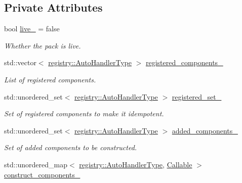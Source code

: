 \subsection*{Private Attributes}
\begin{DoxyCompactItemize}
\item 
bool \hyperlink{structvt_1_1runtime_1_1component_1_1_component_pack_a77177fd8678d5bf04bada652ffee1e2f}{live\+\_\+} = false
\begin{DoxyCompactList}\small\item\em Whether the pack is live. \end{DoxyCompactList}\item 
std\+::vector$<$ \hyperlink{namespacevt_1_1runtime_1_1component_1_1registry_a9b86518797c7bb91babf0ca8ee7d06e6}{registry\+::\+Auto\+Handler\+Type} $>$ \hyperlink{structvt_1_1runtime_1_1component_1_1_component_pack_a615b981d265458c952406691c89ce0f6}{registered\+\_\+components\+\_\+}
\begin{DoxyCompactList}\small\item\em List of registered components. \end{DoxyCompactList}\item 
std\+::unordered\+\_\+set$<$ \hyperlink{namespacevt_1_1runtime_1_1component_1_1registry_a9b86518797c7bb91babf0ca8ee7d06e6}{registry\+::\+Auto\+Handler\+Type} $>$ \hyperlink{structvt_1_1runtime_1_1component_1_1_component_pack_a7dd24ee6d0e1a8e66dd35257ba3e6d75}{registered\+\_\+set\+\_\+}
\begin{DoxyCompactList}\small\item\em Set of registered components to make it idempotent. \end{DoxyCompactList}\item 
std\+::unordered\+\_\+set$<$ \hyperlink{namespacevt_1_1runtime_1_1component_1_1registry_a9b86518797c7bb91babf0ca8ee7d06e6}{registry\+::\+Auto\+Handler\+Type} $>$ \hyperlink{structvt_1_1runtime_1_1component_1_1_component_pack_aebf0761f1902a5336a247190ad8ba47d}{added\+\_\+components\+\_\+}
\begin{DoxyCompactList}\small\item\em Set of added components to be constructed. \end{DoxyCompactList}\item 
std\+::unordered\+\_\+map$<$ \hyperlink{namespacevt_1_1runtime_1_1component_1_1registry_a9b86518797c7bb91babf0ca8ee7d06e6}{registry\+::\+Auto\+Handler\+Type}, \hyperlink{structvt_1_1runtime_1_1component_1_1_component_pack_aa4389ab338cdac3a8900a9e777c0d3c9}{Callable} $>$ \hyperlink{structvt_1_1runtime_1_1component_1_1_component_pack_a94303b85754dae6c7442bdd3de41829f}{construct\+\_\+components\+\_\+}

\end{DoxyCompactItemize}
